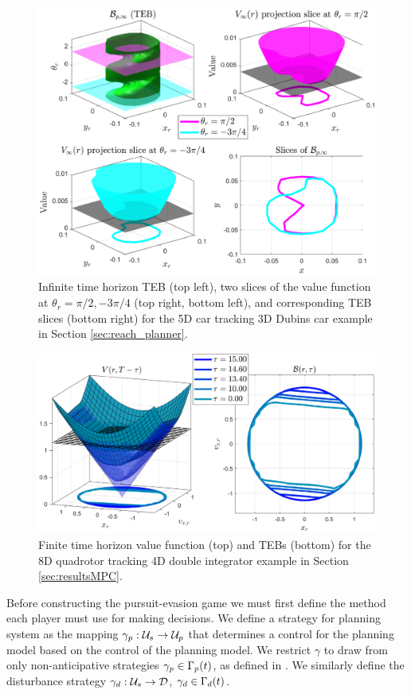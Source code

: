 \begin{figure}
  \includegraphics[width=\columnwidth]{fig/ti_valfunc_5d3d}
  \caption{Infinite time horizon TEB (top left), two slices of the value function at $\theta_r = \pi/2, -3\pi/4$ (top right, bottom left), and corresponding TEB slices (bottom right) for the 5D car tracking 3D Dubins car example in Section \ref{sec:reach_planner}.}
  \label{fig:vf_TEB:5D3D}  
\end{figure}

\begin{figure}
	\centering
  \includegraphics[width=\columnwidth]{fig/tv_valfunc}
  \caption{Finite time horizon value function (top) and TEBs (bottom) for the 8D quadrotor tracking 4D double integrator example in Section \ref{sec:resultsMPC}.}  
  \label{fig:vf_TEB:8D4D}
\end{figure} 

Before constructing the pursuit-evasion game we must first define the method each player must use for making decisions. 
We define a strategy for planning system as the mapping $\gamma_{p} : \mathcal{U}_s \rightarrow \mathcal{U}_p$ that determines a control for the planning model based on the control of the planning model. We restrict $\gamma$ to draw from only non-anticipative strategies $\gamma_{p} \in \Gamma_p(t)$, as defined in \cite{Mitchell05}. 
We similarly define the disturbance strategy $\gamma_{d}: \mathcal{U}_s \rightarrow \mathcal{D}$, $\gamma_{d} \in \Gamma_d(t)$.

